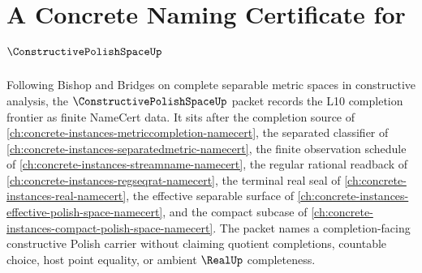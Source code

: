 \chapter{A Concrete Naming Certificate for $\ConstructivePolishSpaceUp$}
\label{ch:concrete-instances-constructive-polish-space-namecert}

Following Bishop and Bridges on complete separable metric spaces in constructive analysis, the $\ConstructivePolishSpaceUp$ packet records the L10 completion frontier as finite NameCert data. It sits after the completion source of \autoref{ch:concrete-instances-metriccompletion-namecert}, the separated classifier of \autoref{ch:concrete-instances-separatedmetric-namecert}, the finite observation schedule of \autoref{ch:concrete-instances-streamname-namecert}, the regular rational readback of \autoref{ch:concrete-instances-regseqrat-namecert}, the terminal real seal of \autoref{ch:concrete-instances-real-namecert}, the effective separable surface of \autoref{ch:concrete-instances-effective-polish-space-namecert}, and the compact subcase of \autoref{ch:concrete-instances-compact-polish-space-namecert}. The packet names a completion-facing constructive Polish carrier without claiming quotient completions, countable choice, host point equality, or ambient $\RealUp$ completeness.

